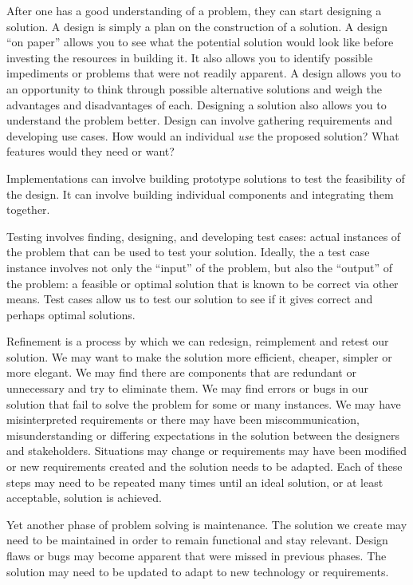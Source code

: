 After one has a good understanding of a problem, they can start designing
a solution.  A design is simply a plan on the construction of a solution.  A
design ``on paper'' allows you to see what the potential solution would look
like before investing the resources in building it.  It also allows you to identify
possible impediments or problems that were not readily apparent.  A
design allows you to an opportunity to think through possible alternative
solutions and weigh the advantages and disadvantages of each.  
Designing a solution also allows you to understand the problem better.
Design can involve gathering requirements and developing 
 use cases.  
How would an individual \emph{use} the proposed solution?  What features
would they need or want?  

Implementations can involve building prototype solutions to test the
feasibility of the design.  It can involve building individual components and
integrating them together.

Testing  involves finding, designing, and developing test cases: actual
instances of the problem that can be used to test your solution.  Ideally, the
a test case instance involves not only the ``input'' of the problem, but also
the ``output'' of the problem: a feasible or optimal solution that is known
to be correct via other means.  Test cases allow us to test our solution to
see if it gives correct and perhaps optimal solutions.  

Refinement is a process by which we can redesign, reimplement and
retest our solution.  We may want to make the solution more efficient, 
cheaper, simpler or more elegant.  We may find there are components
that are redundant or unnecessary and try to eliminate them.  We
may find errors or bugs in our solution that fail to solve the problem 
for some or many instances.  We may have misinterpreted requirements
or there may have been miscommunication, misunderstanding or
differing expectations in the solution between the designers and 
stakeholders.  Situations may change or requirements may have
been modified or new requirements created and the solution needs
to be adapted.  Each of these steps may need to be repeated many
times until an ideal solution, or at least acceptable, solution is achieved.

Yet another phase of problem solving is maintenance.  The solution
we create may need to be maintained in order to remain functional
and stay relevant.  Design flaws or bugs may become apparent that
were missed in previous phases.  The solution may need to be updated
to adapt to new technology or requirements.  

